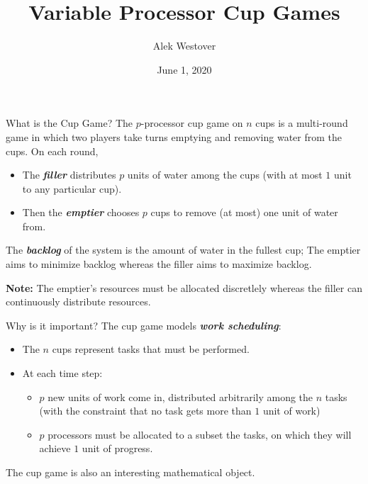 \documentclass[xcolor=x11names, svgnames, rgb]{beamer}
\title{Variable Processor Cup Games}
\author{Alek Westover}
\institute{Belmont High School}
\date{June 1, 2020}
\newcommand{\defn}[1]       {{\textit{\textbf{\boldmath #1}}}}
\begin{document}
 
\frame{\titlepage}

\begin{frame}[t]{What is the Cup Game?}
  The $p$-processor cup game on $n$ cups is a multi-round game in which two
  players take turns emptying and removing water from the cups. On each round,
  \begin{itemize}
    \item The \defn{filler} distributes $p$ units of water among the cups (with at most $1$ unit to any particular cup). 
    \item Then the \defn{emptier} chooses $p$ cups to remove (at most) one unit of water from.
  \end{itemize}

  \vspace{0.4cm}

  The \defn{backlog} of the system is the amount of water in the fullest cup;
  The emptier aims to minimize backlog whereas the filler aims to maximize
  backlog.
  \vspace{0.4cm}

  \textbf{Note:} The emptier's resources must be allocated discretlely whereas
  the filler can continuously distribute resources.
\end{frame}

\begin{frame}[t]{Why is it important?}
  The cup game models \defn{work scheduling}:
  \begin{itemize}
    \item The $n$ cups represent tasks that must be performed. 
    \item At each time step:
      \begin{itemize}
        \item $p$ new units of work come in, distributed
          arbitrarily among the $n$ tasks (with the constraint that no task gets
          more than $1$ unit of work) 
        \item $p$ processors must be allocated to a subset the
          tasks, on which they will achieve $1$ unit of progress.
      \end{itemize}
\end{itemize}

  \vspace{0.5cm}
  The cup game is also an interesting mathematical object.
\end{frame}
\end{document}
